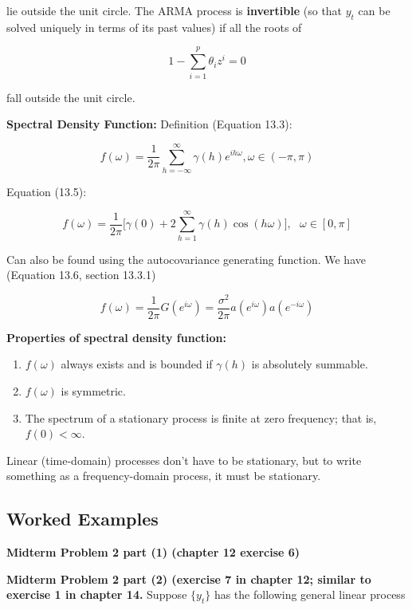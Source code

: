 lie outside the unit circle. The ARMA process is \textbf{invertible} (so that \(y_t\) can be solved uniquely in terms of its past values) if all the roots of 

\[
1 - \sum_{i=1}^p \theta_i z^i = 0
\]

fall outside the unit circle.

\textbf{Spectral Density Function:} Definition (Equation 13.3):

\[
f(\omega) = \frac{1}{2 \pi} \sum_{h = - \infty}^\infty \gamma(h) e^{i h \omega}, \omega \in (-\pi, \pi)
\]

Equation (13.5):

\[
f(\omega) = \frac{1}{2\pi} \bigg[ \gamma(0) + 2 \sum_{h=1}^\infty \gamma(h) \cos(h \omega) \bigg], \ \ \ \omega \in [0, \pi]
\]

Can also be found using the autocovariance generating function. We have (Equation 13.6, section 13.3.1)

\[
f(\omega) = \frac{1}{2\pi}G(e^{i \omega}) = \frac{\sigma^2}{2 \pi} a(e^{i \omega}) a(e^{- i \omega})
\]

\textbf{Properties of spectral density function:}

\begin{enumerate}[(1)]

\item \(f(\omega)\) always exists and is bounded if \(\gamma(h)\) is absolutely summable.

\item \(f(\omega)\) is symmetric.

\item The spectrum of a stationary process is finite at zero frequency; that is, \(f(0) < \infty\).

\end{enumerate}

Linear (time-domain) processes don't have to be stationary, but to write something as a frequency-domain process, it must be stationary.

\subsection{Worked Examples}\label{ts.ch13.examples}


\textbf{Midterm Problem 2 part (1) (chapter 12 exercise 6)}

\textbf{Midterm Problem 2 part (2) (exercise 7 in chapter 12; similar to exercise 1 in chapter 14.} Suppose \(\{y_t\}\) has the following general linear process

